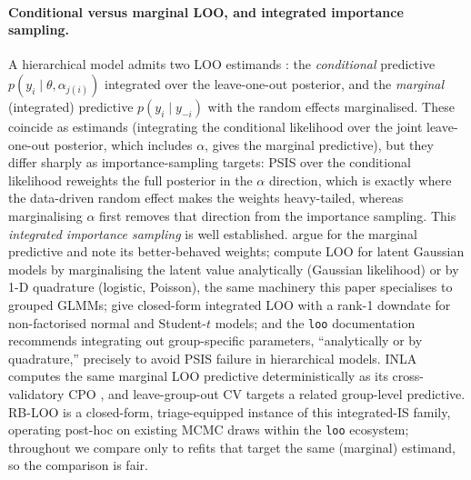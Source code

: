\documentclass[11pt]{article}
\begin{document}
\paragraph{Conditional versus marginal LOO, and integrated importance sampling.}
A hierarchical model admits two LOO estimands \citep{merkle2019bayesian}: the
\emph{conditional} predictive $p(y_i \mid \theta, \alpha_{j(i)})$ integrated over
the leave-one-out posterior, and the \emph{marginal} (integrated) predictive
$p(y_i \mid y_{-i})$ with the random effects marginalised. These coincide as
estimands (integrating the conditional likelihood over the joint leave-one-out
posterior, which includes $\alpha$, gives the marginal predictive), but they
differ sharply as importance-sampling targets: PSIS over the conditional likelihood
reweights the full posterior in the $\alpha$ direction, which is exactly where the
data-driven random effect makes the weights heavy-tailed, whereas marginalising
$\alpha$ first removes that direction from the importance sampling. This
\emph{integrated importance sampling} is well established. \citet{merkle2019bayesian}
argue for the marginal predictive and note its better-behaved weights;
\citet{vehtari2016glvm} compute LOO for latent Gaussian models by marginalising the
latent value analytically (Gaussian likelihood) or by 1-D quadrature (logistic,
Poisson), the same machinery this paper specialises to grouped GLMMs;
\citet{burkner2021efficient} give closed-form integrated LOO with a rank-1 downdate
for non-factorised normal and Student-$t$ models; and the \texttt{loo} documentation
recommends integrating out group-specific parameters, ``analytically or by
quadrature,'' precisely to avoid PSIS failure in hierarchical models. INLA computes
the same marginal LOO predictive deterministically as its cross-validatory CPO
\citep{rue2009inla, held2010posterior}, and leave-group-out CV
\citep{liu2022leave} targets a related group-level predictive. RB-LOO is a
closed-form, triage-equipped instance of this integrated-IS family, operating
post-hoc on existing MCMC draws within the \texttt{loo} ecosystem; throughout we
compare only to refits that target the same (marginal) estimand, so the comparison
is fair.
\end{document}
